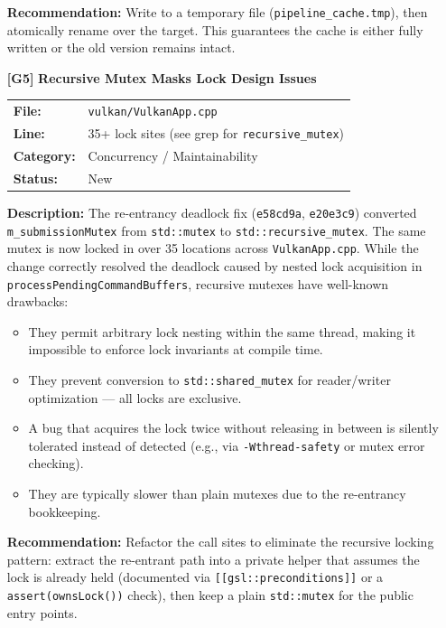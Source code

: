 \documentclass[a4paper,12pt]{article}
\newcommand{\severitybox}[2]{%
  \colorbox{#1}{\makebox[2.5cm][c]{\textcolor{white}{\textbf{#2}}}}%
}
\begin{document}
\begin{enumerate}[leftmargin=*]
  \textbf{Recommendation:}
  Write to a temporary file (\texttt{pipeline\_cache.tmp}), then atomically
  rename over the target. This guarantees the cache is either fully written
  or the old version remains intact.

\item[\textbf{[G5]}] \textbf{Recursive Mutex Masks Lock Design Issues}
  \hfill \severitybox{mediumcolor}{MEDIUM}

  \begin{tabular}{ll}
    \textbf{File:} & \texttt{vulkan/VulkanApp.cpp} \\
    \textbf{Line:} & 35+ lock sites (see grep for \texttt{recursive\_mutex}) \\
    \textbf{Category:} & Concurrency / Maintainability \\
    \textbf{Status:} & New \\
  \end{tabular}

  \textbf{Description:}
  The re-entrancy deadlock fix (\texttt{e58cd9a}, \texttt{e20e3c9}) converted
  \texttt{m\_submissionMutex} from \texttt{std::mutex} to
  \texttt{std::recursive\_mutex}. The same mutex is now locked in over 35
  locations across \texttt{VulkanApp.cpp}. While the change correctly resolved
  the deadlock caused by nested lock acquisition in
  \texttt{processPendingCommandBuffers}, recursive mutexes have well-known
  drawbacks:

  \begin{itemize}[noitemsep]
    \item They permit arbitrary lock nesting within the same thread, making it
          impossible to enforce lock invariants at compile time.
    \item They prevent conversion to \texttt{std::shared\_mutex} for
          reader/writer optimization — all locks are exclusive.
    \item A bug that acquires the lock twice without releasing in between is
          silently tolerated instead of detected (e.g., via
          \texttt{-Wthread-safety} or mutex error checking).
    \item They are typically slower than plain mutexes due to the re-entrancy
          bookkeeping.
  \end{itemize}

  \textbf{Recommendation:}
  Refactor the call sites to eliminate the recursive locking pattern:
  extract the re-entrant path into a private helper that assumes the lock is
  already held (documented via \texttt{[[gsl::preconditions]]} or a
  \texttt{assert(ownsLock())} check), then keep a plain \texttt{std::mutex}
  for the public entry points.


\end{enumerate}
\end{document}
